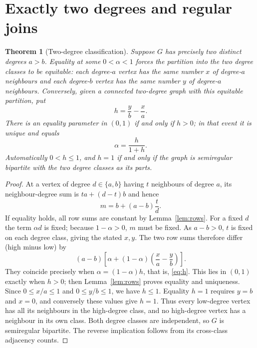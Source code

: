 \documentclass[11pt]{amsart}
\newtheorem{theorem}{Theorem}[section]
\theoremstyle{remark}
\begin{document}
\section{Exactly two degrees and regular joins}\label{sec:twodegrees}
\begin{theorem}[Two-degree classification]\label{thm:two}
Suppose $G$ has precisely two distinct degrees $a>b$.
Equality at some $0<\alpha<1$ forces the partition into the two degree
classes to be equitable: each degree-$a$ vertex has the same number
$x$ of degree-$a$ neighbours and each degree-$b$ vertex has the same
number $y$ of degree-$a$ neighbours. Conversely, given a connected
two-degree graph with this equitable partition, put
\[
 h=\frac yb-\frac xa.
\]
There is an equality parameter in $(0,1)$ if and only if $h>0$;
in that event it is unique and equals
\begin{equation}\label{eq:h}
 \alpha=\frac{h}{1+h}.
\end{equation}
Automatically $0<h\leq1$, and $h=1$ if and only if the graph is
semiregular bipartite with the two degree classes as its parts.
\end{theorem}
\begin{proof}
At a vertex of degree $d\in\{a,b\}$ having $t$ neighbours of
degree $a$, its neighbour-degree sum is $ta+(d-t)b$ and hence
\[
 m=b+(a-b)\frac{t}{d}.
\]
If equality holds, all row sums are constant by Lemma~\ref{lem:rows}.
For a fixed $d$ the term $\alpha d$ is fixed; because
$1-\alpha>0$, $m$ must be fixed. As $a-b>0$, $t$ is fixed on
each degree class, giving the stated $x,y$.
The two row sums therefore differ (high minus low) by
\[
 (a-b)\left[\alpha+(1-\alpha)
                  \left(\frac xa-\frac yb\right)\right].
\]
They coincide precisely when $\alpha=(1-\alpha)h$, that is,
\eqref{eq:h}. This lies in $(0,1)$ exactly when $h>0$;
then Lemma~\ref{lem:rows} proves equality and uniqueness.
Since $0\leq x/a\leq1$ and $0\leq y/b\leq1$, we have $h\leq1$.
Equality $h=1$ requires $y=b$ and $x=0$, and conversely these
values give $h=1$. Thus every low-degree vertex has all its
neighbours in the high-degree class, and no high-degree vertex
has a neighbour in its own class. Both degree classes are
independent, so $G$ is semiregular bipartite. The reverse implication
follows from its cross-class adjacency counts.
\end{proof}
\end{document}
